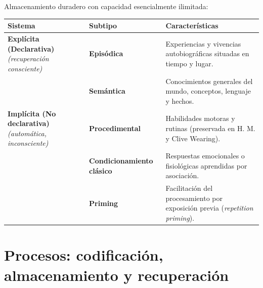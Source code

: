 \documentclass[11pt,a4paper]{article}
\begin{document}
Almacenamiento duradero con capacidad esencialmente ilimitada:

\begin{center}
\begin{tabular}{@{}p{4.0cm}p{3.6cm}p{6.8cm}@{}}
\toprule
\textbf{Sistema} & \textbf{Subtipo} & \textbf{Características} \\
\midrule
\textbf{Explícita (Declarativa)} \newline \textit{(recuperación consciente)} & \textbf{Episódica} & Experiencias y vivencias autobiográficas situadas en tiempo y lugar. \\
 & \textbf{Semántica} & Conocimientos generales del mundo, conceptos, lenguaje y hechos. \\
\midrule
\textbf{Implícita (No declarativa)} \newline \textit{(automática, inconsciente)} & \textbf{Procedimental} & Habilidades motoras y rutinas (preservada en H. M. y Clive Wearing). \\
 & \textbf{Condicionamiento clásico} & Respuestas emocionales o fisiológicas aprendidas por asociación. \\
 & \textbf{Priming} & Facilitación del procesamiento por exposición previa (\textit{repetition priming}). \\
\bottomrule
\end{tabular}
\end{center}

\section{Procesos: codificación, almacenamiento y recuperación}
\end{document}
